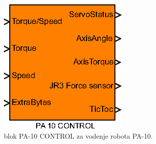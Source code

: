 \begin{figure}[!h]
	\centering
	\includegraphics[scale=1]{./Slike/simulink-pa-10.eps}
	\caption{\simulink blok PA-10 CONTROL za vodenje robota PA-10.}
	\label{fig:simulink-pa-10}
\end{figure}
